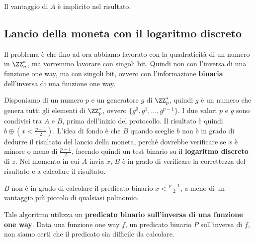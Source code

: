 Il vantaggio di $A$ è implicito nel risultato.
\subsection{Lancio della moneta con il logaritmo discreto}
Il problema è che fino ad ora abbiamo lavorato con la quadraticità di un numero 
in $\ZZ_n^*$, ma vorremmo lavorare con singoli bit. Quindi non con l'inversa di una 
funzione one way, ma con singoli bit, ovvero con l'informazione \textbf{binaria} 
dell'inversa di una funzione one way.

Disponiamo di un numero $p$ e un generatore $g$ di $\ZZ_p^*$, quindi $g$ è un numero
che genera tutti gli elementi di $\ZZ_p^*$, ovvero $\{g^0, g^1, \ldots, g^{p-1}\}$.
I due valori $p$ e $g$ sono condivisi tra $A$ e $B$, prima dell'inizio del protocollo.
Il risultato è quindi $b \oplus \left( x < \frac{p-1}{2}\right)$. L'idea di fondo è che $B$ 
quando sceglie $b$ non è in grado di dedurre il risultato del lancio della moneta, perché
dovrebbe verificare se $x$ è minore o meno di $\frac{p-1}{2}$, facendo quindi un test binario 
su il \textbf{logaritmo discreto} di $z$. Nel momento in cui $A$ invia $x$, $B$ è in grado
di verificare la correttezza del risultato e a calcolare il risultato.

\begin{tcolorbox}
  $B$ non è in grado di calcolare il predicato binario $x < \frac{p-1}{2}$, a meno di un 
  vantaggio più piccolo di qualsiasi polinomio.
\end{tcolorbox}
Tale algoritmo utilizza un \textbf{predicato binario sull'inversa di una funzione one way}.
Data una funzione one way $f$, un predicato binario $P$ sull'inversa di $f$, non siamo 
certi che il predicato sia difficile da calcolare. 

